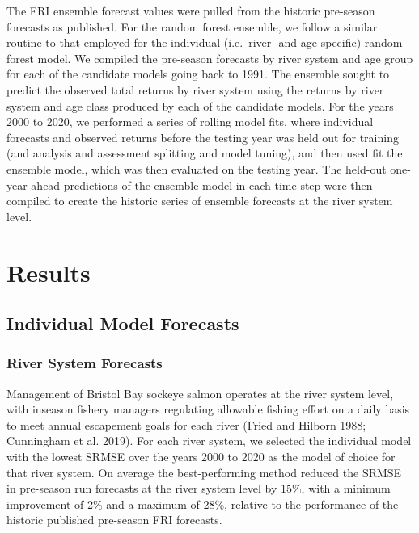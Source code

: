 \documentclass[
]{article}
\begin{document}
The FRI ensemble forecast values were pulled from the historic pre-season forecasts as published. For the random forest ensemble, we follow a similar routine to that employed for the individual (i.e.~river- and age-specific) random forest model. We compiled the pre-season forecasts by river system and age group for each of the candidate models going back to 1991. The ensemble sought to predict the observed total returns by river system using the returns by river system and age class produced by each of the candidate models. For the years 2000 to 2020, we performed a series of rolling model fits, where individual forecasts and observed returns before the testing year was held out for training (and analysis and assessment splitting and model tuning), and then used fit the ensemble model, which was then evaluated on the testing year. The held-out one-year-ahead predictions of the ensemble model in each time step were then compiled to create the historic series of ensemble forecasts at the river system level.

\hypertarget{results}{%
\section{Results}\label{results}}

\hypertarget{individual-model-forecasts}{%
\subsection{Individual Model Forecasts}\label{individual-model-forecasts}}

\hypertarget{river-system-forecasts}{%
\subsubsection{River System Forecasts}\label{river-system-forecasts}}

Management of Bristol Bay sockeye salmon operates at the river system level, with inseason fishery managers regulating allowable fishing effort on a daily basis to meet annual escapement goals for each river (Fried and Hilborn 1988; Cunningham et al. 2019). For each river system, we selected the individual model with the lowest SRMSE over the years 2000 to 2020 as the model of choice for that river system. On average the best-performing method reduced the SRMSE in pre-season run forecasts at the river system level by 15\%, with a minimum improvement of 2\% and a maximum of 28\%, relative to the performance of the historic published pre-season FRI forecasts.
\end{document}
